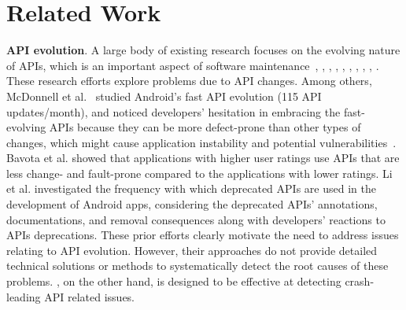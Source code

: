 \section{Related Work}\label{sec-related}

\textbf{API evolution}. A large body of existing
research focuses on the evolving nature of APIs, which
is an important aspect of software
maintenance~\cite{mcdonnell2013empirical},
\cite{bavota2015impact}, \cite{ACRYL_Scalabrino2019},
\cite{li2018characterising},
\cite{lamothe2018exploring}, \cite{linares2013api},
\cite{Luo2018},
\cite{Fazzini:2017:ACI:3155562.3155604},
\cite{mahmoudi2018android}, \cite{mutchler2016target}.
These research efforts explore problems due to API
changes. Among others, McDonnell et
al.~\cite{mcdonnell2013empirical} studied Android's
fast API evolution (115 API updates/month), and noticed
developers' hesitation in embracing the fast-evolving
APIs because they can be more defect-prone than other
types of changes, which might cause application
instability and potential
vulnerabilities~\cite{linares2013api}.  
Bavota et al.  \cite{bavota2015impact}
showed that applications with higher user ratings use
APIs that are less change- and fault-prone compared to
the applications with lower ratings. 
Li et al.  \cite{li2018characterising} investigated the
frequency with which deprecated APIs are used in the
development of Android apps, considering the deprecated
APIs' annotations, documentations, and removal
consequences along with developers' reactions to APIs
deprecations. 
%
%
%
%
These prior efforts clearly motivate the need to address
issues relating to API evolution.  However, their
approaches do not provide detailed technical solutions or
methods to systematically detect the root causes of these
problems.  \textsc{\@approach}, on the other hand, is
designed to be effective at detecting crash-leading API
related issues.



